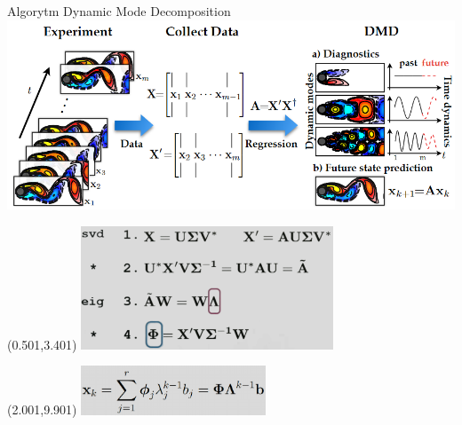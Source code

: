 \documentclass[aspectratio=169]{beamer}
\begin{document}
\begin{frame} {Algorytm Dynamic Mode Decomposition}
\includegraphics[width=14cm]{imgs/dmd_img.png}
\begin{textblock}{18}(0.501,3.401)
	\includegraphics[width=7.5cm]{imgs/dmd_alg2_grey.png}
\end{textblock}
\begin{textblock}{18}(2.001,9.901)
\includegraphics[width=5.5cm]{imgs/dmd_xk_grey.png}
\end{textblock}
\end{frame}
\end{document}
